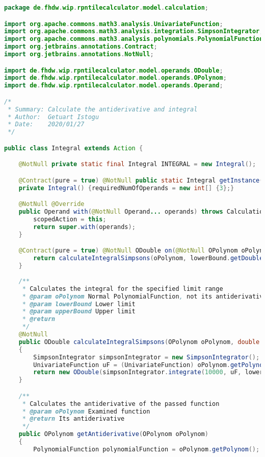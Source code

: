 \begin{lstlisting}[caption=Integral (Istogu),label=list:Integral,language=Java]
package de.fhdw.wip.rpntilecalculator.model.calculation;

import org.apache.commons.math3.analysis.UnivariateFunction;
import org.apache.commons.math3.analysis.integration.SimpsonIntegrator;
import org.apache.commons.math3.analysis.polynomials.PolynomialFunction;
import org.jetbrains.annotations.Contract;
import org.jetbrains.annotations.NotNull;

import de.fhdw.wip.rpntilecalculator.model.operands.ODouble;
import de.fhdw.wip.rpntilecalculator.model.operands.OPolynom;
import de.fhdw.wip.rpntilecalculator.model.operands.Operand;

/*
 * Summary: Calculate the antiderivative and integral
 * Author:  Getuart Istogu
 * Date:    2020/01/27
 */

public class Integral extends Action {

    @NotNull private static final Integral INTEGRAL = new Integral();

    @Contract(pure = true) @NotNull public static Integral getInstance() { return INTEGRAL; }
    private Integral() {requiredNumOfOperands = new int[] {3};}

    @NotNull @Override
    public Operand with(@NotNull Operand... operands) throws CalculationException {
        scopedAction = this;
        return super.with(operands);
    }

    @Contract(pure = true) @NotNull ODouble on(@NotNull OPolynom oPolynom, @NotNull ODouble lowerBound, @NotNull ODouble upperBound) {
        return calculateIntegralSimpsons(oPolynom, lowerBound.getDouble(), upperBound.getDouble());
    }
    
    /**
     * Calculates the integral for the specified limit range
     * @param oPolynom Normal PolynomialFunction, not its antiderivative
     * @param lowerBound Lower limit
     * @param upperBound Upper limit
     * @return
     */
    @NotNull
    public ODouble calculateIntegralSimpsons(OPolynom oPolynom, double lowerBound, double upperBound)
    {
        SimpsonIntegrator simpsonIntegrator = new SimpsonIntegrator();
        UnivariateFunction uF = (UnivariateFunction) oPolynom.getPolynom();
        return new ODouble(simpsonIntegrator.integrate(10000, uF, lowerBound, upperBound));
    }

    /**
     * Calculates the antiderivative of the passed function
     * @param oPolynom Examined function
     * @return Its antiderivative
     */
    public OPolynom getAntiderivative(OPolynom oPolynom)
    {
        PolynomialFunction polynomialFunction = oPolynom.getPolynom();


\end{lstlisting}
